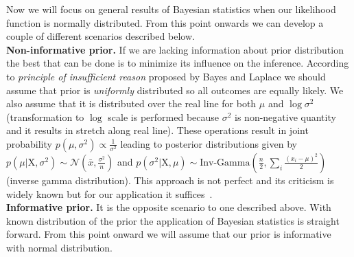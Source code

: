 \documentclass[12pt, a4paper, pdflatex]{report}
\begin{document}
Now we will focus on general results of Bayesian statistics when our likelihood function is normally distributed. From this point onwards we can develop a couple of different scenarios described below.\\

\textbf{\textrm{Non-informative prior. }}If we are lacking information about prior distribution the best that can be done is to minimize its influence on the inference. According to \emph{principle of insufficient reason} proposed by Bayes and Laplace we should assume that prior is \emph{uniformly} distributed so all outcomes are equally likely. We also assume that it is distributed over the real line for both $\mu$ and $\log \sigma^2$ (transformation to $\log$ scale is performed because $\sigma^2$ is non-negative quantity and it results in stretch along real line). These operations result in joint probability $p \left( \mu, \sigma^2 \right) \propto \frac{1}{\sigma^2} $ leading to posterior distributions given by $p \left( \mu | \mathrm{X}, \sigma^2 \right) \sim \mathcal{N} \left( \bar{x}, \frac{\sigma^2}{n} \right) $ and $p \left( \sigma^2 | \mathrm{X}, \mu \right) \sim \mathrm{Inv}\text{-}\mathrm{Gamma} \left( \frac{n}{2} , \sum_{i} \frac{\left( x_i - \mu \right)^2}{2}  \right) $ (inverse gamma distribution). This approach is not perfect and its criticism is widely known but for our application it suffices~\cite{Syversveen98noninformativebayesian}.\\


\textbf{\textrm{Informative prior. }}It is the opposite scenario to one described above. With known distribution of the prior the application of Bayesian statistics is straight forward. From this point onward we will assume that our prior is informative with normal distribution.\\
\end{document}
